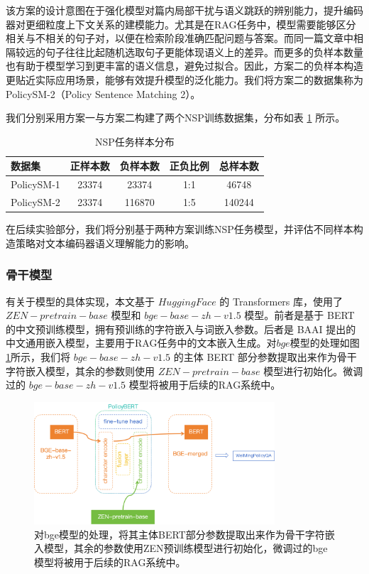 \documentclass[12pt, a4paper]{ctexart}
\begin{document}
该方案的设计意图在于强化模型对篇内局部干扰与语义跳跃的辨别能力，提升编码器对更细粒度上下文关系的建模能力。尤其是在RAG任务中，模型需要能够区分相关与不相关的句子对，以便在检索阶段准确匹配问题与答案。而同一篇文章中相隔较远的句子往往比起随机选取句子更能体现语义上的差异。而更多的负样本数量也有助于模型学习到更丰富的语义信息，避免过拟合。因此，方案二的负样本构造更贴近实际应用场景，能够有效提升模型的泛化能力。我们将方案二的数据集称为PolicySM-2（Policy Sentence Matching 2）。

我们分别采用方案一与方案二构建了两个NSP训练数据集，分布如表 \ref{tab:nsp_samples} 所示。

\begin{table}[H]
    \centering
    \caption{NSP任务样本分布}
    \begin{tabular}{lcccc}
        \toprule
        数据集 & 正样本数 & 负样本数 & 正负比例 & 总样本数 \\
        \midrule
        PolicySM-1 & 23374 & 23374 & 1:1 & 46748 \\
        PolicySM-2 & 23374 & 116870 & 1:5 & 140244 \\
        \bottomrule
    \end{tabular}
    \label{tab:nsp_samples}
\end{table}

在后续实验部分，我们将分别基于两种方案训练NSP任务模型，并评估不同样本构造策略对文本编码器语义理解能力的影响。

\subsubsection{骨干模型}
有关于模型的具体实现，本文基于 $Hugging Face$ 的 Transformers 库，使用了 $ZEN-pretrain-base$ 模型和 $bge-base-zh-v1.5$ 模型。前者是基于 BERT 的中文预训练模型，拥有预训练的字符嵌入与词嵌入参数。后者是 BAAI 提出的中文通用嵌入模型，主要用于RAG任务中的文本嵌入生成。对$bge$模型的处理如图\ref{fig:model_merge}所示，我们将 $bge-base-zh-v1.5$ 的主体 BERT 部分参数提取出来作为骨干字符嵌入模型，其余的参数则使用 $ZEN-pretrain-base$ 模型进行初始化。微调过的 $bge-base-zh-v1.5$ 模型将被用于后续的RAG系统中。

\begin{figure}[H]
    \centering
    \includegraphics[width=0.8\textwidth]{images/model_merge.png}
    \caption{对bge模型的处理，将其主体BERT部分参数提取出来作为骨干字符嵌入模型，其余的参数使用ZEN预训练模型进行初始化，微调过的bge模型将被用于后续的RAG系统中。}
    \label{fig:model_merge}
\end{figure}
\end{document}
